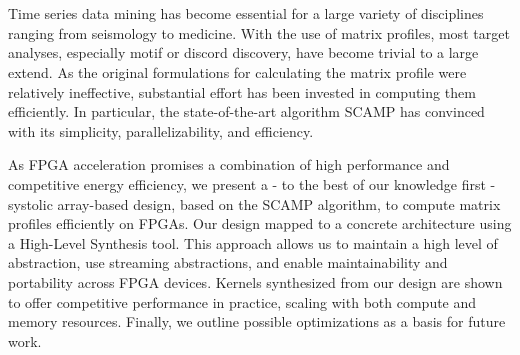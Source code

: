 \chapter{\abstractname}

Time series data mining has become essential for a large variety of disciplines ranging from seismology to medicine. With the use of matrix profiles, most target analyses,
especially motif or discord discovery, have become trivial to a large extend. As the original formulations for calculating the matrix profile were relatively ineffective,
substantial effort has been invested in computing them efficiently. In particular, the
state-of-the-art algorithm SCAMP has convinced with its simplicity, parallelizability,
and efficiency.

As FPGA acceleration promises a combination of high performance
and competitive energy efficiency, we present a - to the best of our knowledge first -
systolic array-based design, based on the SCAMP algorithm, to compute matrix profiles
efficiently on FPGAs. Our design mapped to a concrete architecture using a High-Level
Synthesis tool. This approach allows us to maintain a high level of abstraction, use
streaming abstractions, and enable maintainability and portability across FPGA devices.
Kernels synthesized from our design are shown to offer competitive performance in
practice, scaling with both compute and memory resources. Finally, we outline possible
optimizations as a basis for future work.